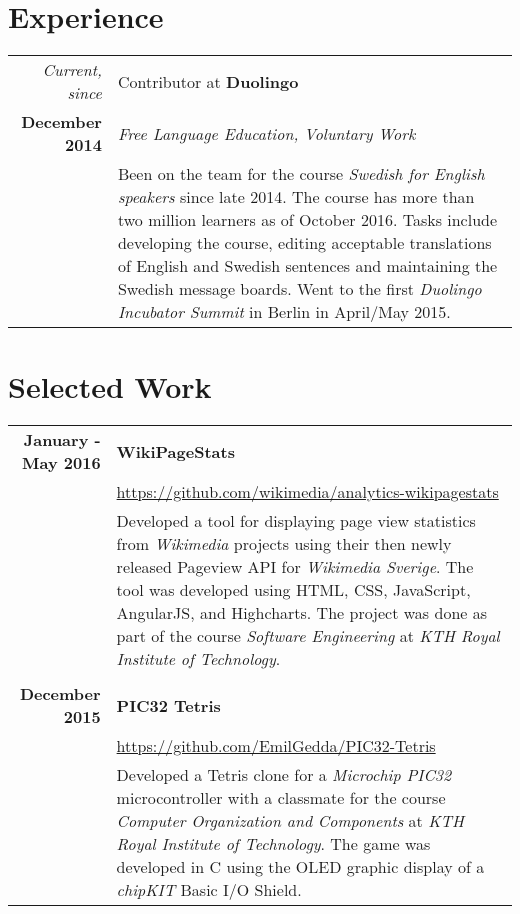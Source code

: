\documentclass[a4paper,10pt]{article}
\begin{document}
\section{Experience}
\begin{tabular}{r|p{11cm}}
 \emph{Current, since} & Contributor at \textbf{Duolingo}\\\textbf{December 2014}&\emph{Free Language Education, Voluntary Work}\\&\footnotesize{Been on the team for the course \emph{Swedish for English speakers} since late 2014. The course has more than two million learners as of October 2016. Tasks include developing the course, editing acceptable translations of English
 and Swedish sentences and maintaining the Swedish message boards. Went to the first \emph{Duolingo Incubator Summit} in Berlin in April/May 2015.}\\ 
\end{tabular}

\section{Selected Work}
\begin{tabular}{r|p{11cm}}
\textbf{January - May 2016} & \textbf{WikiPageStats} \\
    & \href{https://github.com/wikimedia/analytics-wikipagestats}{https://github.com/wikimedia/analytics-wikipagestats} \\
    & \footnotesize{Developed a tool for displaying page view statistics from \emph{Wikimedia} projects using their then newly released Pageview API for \emph{Wikimedia Sverige}. The tool was developed using HTML, CSS, JavaScript, AngularJS, and Highcharts. The project was done as part of the course \emph{Software Engineering} at \emph{KTH Royal Institute of Technology}.}\\
&\\
\textbf{December 2015} & \textbf{PIC32 Tetris} \\
    & \href{https://github.com/EmilGedda/PIC32-Tetris}{https://github.com/EmilGedda/PIC32-Tetris} \\
    & \footnotesize{Developed a Tetris clone for a \emph{Microchip PIC32} microcontroller with a classmate for the course \emph{Computer Organization and Components} at \emph{KTH Royal Institute of Technology}. The game was developed in C using the OLED graphic display of a \emph{chipKIT} Basic I/O Shield.}
\end{tabular}
\end{document}
